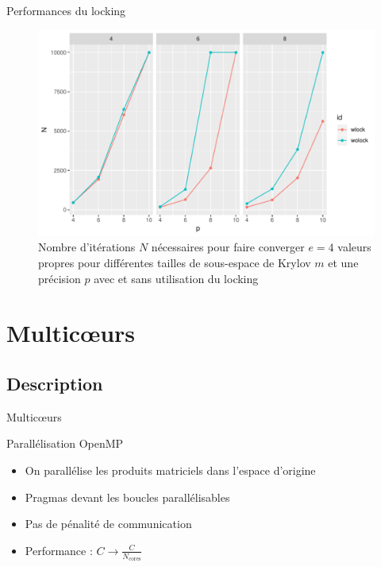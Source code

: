 \documentclass[9.5pt]{beamer}
\begin{document}
		\begin{frame}{Performances du locking}
			\begin{figure}
				\centering
				\includegraphics[width=0.8\linewidth, keepaspectratio]{../rapport/plots/Nvsp_complock.pdf}
				\caption{Nombre d'itérations $N$ nécessaires pour faire converger $e = 4$ valeurs propres pour différentes tailles de sous-espace de Krylov $m$ et une précision $p$ avec et sans utilisation du locking \label{fig:Nvsp_complock}}
			\end{figure}
		\end{frame}

\section{Multic\oe{}urs}
		\subsection{Description}
		\begin{frame}{Multic\oe{}urs}
			\begin{block}{Parallélisation OpenMP}
				\begin{itemize}
					\item On parallélise les produits matriciels dans l'espace d'origine
					\item Pragmas devant les boucles parallélisables
					\item Pas de pénalité de communication
					\item Performance : $C \rightarrow \frac{C}{N_\text{cores}}$
				\end{itemize}
			\end{block}
		\end{frame}
\end{document}
